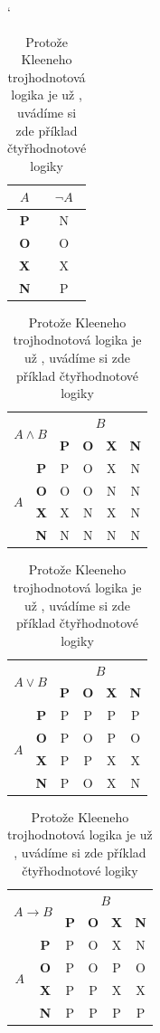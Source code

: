 \documentclass[11pt,a4paper]{article}
\begin{document}
\begin{table}[h]
\catcode`
\begin{center}
\begin{tabular}{|c|c|} \hline
$A$ & $\neg A$ \\ \hline
\textbf{P} & N \\ \hline
\textbf{O} & O \\ \hline
\textbf{X} & X \\ \hline
\textbf{N} & P \\ \hline
\end{tabular}
\begin{tabular}{|c|c|c|c|c|c|} \hline
\multicolumn{2}{|c|}{\multirow{2}{*}{$A \wedge B$}} & \multicolumn{4}{|c|}{$B$} \\ \cline{3-6}
\multicolumn{2}{|c|}{} & \textbf{P} & \textbf{O} & \textbf{X} & \textbf{N} \\ \hline
\multirow{4}{*}{$A$} & \textbf{P} & P & O & X & N \\ \cline{2-6}
 & \textbf{O} & O & O & N & N \\ \cline{2-6}
 & \textbf{X} & X & N & X & N \\ \cline{2-6}
 & \textbf{N} & N & N & N & N \\ \hline
\end{tabular}
\begin{tabular}{|c|c|c|c|c|c|} \hline
\multicolumn{2}{|c|}{\multirow{2}{*}{$A \vee B$}} & \multicolumn{4}{|c|}{$B$} \\ \cline{3-6}
\multicolumn{2}{|c|}{} & \textbf{P} & \textbf{O} & \textbf{X} & \textbf{N} \\ \hline
\multirow{4}{*}{$A$} & \textbf{P} & P & P & P & P \\ \cline{2-6}
 & \textbf{O} & P & O & P & O \\ \cline{2-6}
 & \textbf{X} & P & P & X & X \\ \cline{2-6}
 & \textbf{N} & P & O & X & N \\ \hline
\end{tabular}
\begin{tabular}{|c|c|c|c|c|c|} \hline
\multicolumn{2}{|c|}{\multirow{2}{*}{$A \rightarrow B$}} & \multicolumn{4}{|c|}{$B$} \\ \cline{3-6}
\multicolumn{2}{|c|}{} & \textbf{P} & \textbf{O} & \textbf{X} & \textbf{N} \\ \hline
\multirow{4}{*}{$A$} & \textbf{P} & P & O & X & N \\ \cline{2-6}
 & \textbf{O} & P & O & P & O \\ \cline{2-6}
 & \textbf{X} & P & P & X & X \\ \cline{2-6}
 & \textbf{N} & P & P & P & P \\ \hline
\end{tabular}
\caption{Protože Kleeneho trojhodnotová logika je už , uvádíme si zde příklad čtyřhodnotové logiky}\label{tab:tab2}
\end{center}
\end{table}
\pagebreak
\end{document}
